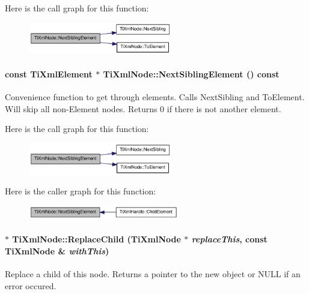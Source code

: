 Here is the call graph for this function:\nopagebreak
\begin{figure}[H]
\begin{center}
\leavevmode
\includegraphics[width=178pt]{class_ti_xml_node_a3d7897999f99cf4870dd59df6331d7ff_cgraph}
\end{center}
\end{figure}
\hypertarget{class_ti_xml_node_a7667217e269e0da01d1f82aee94d1a3d}{
\paragraph[{NextSiblingElement}]{\setlength{\rightskip}{0pt plus 5cm}const {\bf TiXmlElement} $\ast$ TiXmlNode::NextSiblingElement () const}\hfill}
\label{class_ti_xml_node_a7667217e269e0da01d1f82aee94d1a3d}
Convenience function to get through elements. Calls NextSibling and ToElement. Will skip all non-\/Element nodes. Returns 0 if there is not another element. 

Here is the call graph for this function:\nopagebreak
\begin{figure}[H]
\begin{center}
\leavevmode
\includegraphics[width=178pt]{class_ti_xml_node_a7667217e269e0da01d1f82aee94d1a3d_cgraph}
\end{center}
\end{figure}


Here is the caller graph for this function:\nopagebreak
\begin{figure}[H]
\begin{center}
\leavevmode
\includegraphics[width=186pt]{class_ti_xml_node_a7667217e269e0da01d1f82aee94d1a3d_icgraph}
\end{center}
\end{figure}
\hypertarget{class_ti_xml_node_a543208c2c801c84a213529541e904b9f}{
\paragraph[{ReplaceChild}]{ $\ast$ TiXmlNode::ReplaceChild ({\bf TiXmlNode} $\ast$ {\em replaceThis}, \/  const {\bf TiXmlNode} \& {\em withThis})}\hfill}
\label{class_ti_xml_node_a543208c2c801c84a213529541e904b9f}
Replace a child of this node. Returns a pointer to the new object or NULL if an error occured. 

